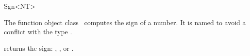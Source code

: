 \begin{ccRefFunctionObjectClass}{Sgn<NT>}

\ccDefinition

The function object class \ccRefName\ computes the sign of a number.
It is named  to avoid a conflict with the type .



\ccIsModel
{}

{returns the sign: , , or .}


\end{ccRefFunctionObjectClass}

